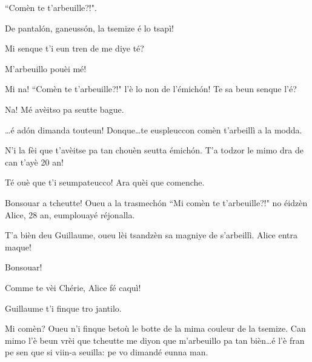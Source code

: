 \begin{drama}

\Vioupspeaks ``Comèn te t'arbeuille?!".

\Vioujspeaks{} De pantal\'on, ganeuss\'on, la tsemize é lo tsapì!

\Vioupspeaks Mi senque t'i eun tren de me diye té?

\Vioujspeaks M'arbeuillo pouèi mé!

\Vioupspeaks Mi na! ``Comèn te t’arbeuille?!" l’è lo non de l'émich\'on! Te sa beun senque l'é?

\Vioujspeaks Na! Mé avèitso pa seutte bague.

\Vioupspeaks \ldots é ad\'on dimanda touteun! Donque\ldots te euspleuccon comèn t'arbeillì a la modda.

\Vioujspeaks N'i la fèi que t'avèitse pa tan chouèn seutta émich\'on. T'a todzor le mimo dra de can t'ayè 20 an!

\Vioupspeaks{} Té ouè que t'i seumpateucco! Ara quèi que comenche.





\Guillaumespeaks Bonsouar a tcheutte! Oueu a la trasmech\'on ``Mi comèn te t'arbeuille?!" no éidzèn Alice, 28 an, eumplouayé réjonalla.

\Cheriespeaks T'a bièn deu Guillaume, oueu lèi tsandzèn sa magniye de s’arbeillì. Alice entra maque!


\Alicespeaks Bonsouar!


\Guillaumespeaks Comme te vèi Chérie, Alice fé caquì!

\Cheriespeaks Guillaume t’i finque tro jantilo. 

\Alicespeaks Mi comèn? Oueu n'i finque betoù le botte de la mima couleur de la tsemize. Can mimo l'è beun vrèi que tcheutte me diyon que m'arbeuillo pa tan bièn\ldots é l'è fran pe sen que si viin-a seuilla: pe vo dimandé eunna man.


\end{drama}
